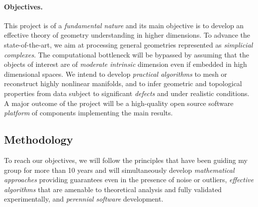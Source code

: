 \paragraph{Objectives.} 
This project is of a {\em fundamental nature} and its main objective is to develop an effective theory of geometry understanding in higher dimensions. To advance the state-of-the-art, we aim at processing general geometries represented as {\em simplicial complexes}. The computational bottleneck will be bypassed by assuming that the objects of interest are of {\em moderate intrinsic} dimension even if embedded in high dimensional spaces. We intend to develop {\em practical algorithms} to mesh or reconstruct highly nonlinear manifolds, and to infer geometric and topological properties from data subject to significant {\em defects} and
 under realistic conditions. A major outcome of the project will be a high-quality open source software {\em platform} of components implementing the main results.





\subsection{Methodology}
To reach our objectives, we will follow the principles that have been guiding my group for more than 10 years and will simultaneously develop
{\em mathematical approaches} providing guarantees even in the presence of noise or outliers,
{\em effective algorithms} that are amenable to theoretical analysis and fully validated experimentally,
and {\em perennial software} development.

